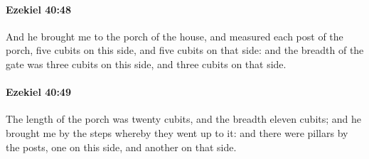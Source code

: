 		\paragraph{Ezekiel 40:48} %
			\label{EZEKIEL-40-48}

			And he brought me to the porch of the house, and measured each post of the porch, five cubits on this side, and five cubits on that side: and the breadth of the gate was three cubits on this side, and three cubits on that side.


		\paragraph{Ezekiel 40:49} %
			\label{EZEKIEL-40-49}

			The length of the porch was twenty cubits, and the breadth eleven cubits; and he brought me by the steps whereby they went up to it: and there were pillars by the posts, one on this side, and another on that side.

